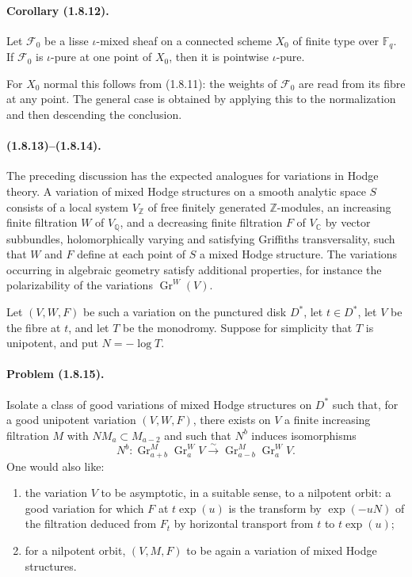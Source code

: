 \documentclass[11pt]{article}
\theoremstyle{remark}
\newcommand{\ZZ}{\mathbb{Z}}
\newcommand{\QQ}{\mathbb{Q}}
\newcommand{\CC}{\mathbb{C}}
\newcommand{\Fq}{\mathbb{F}_q}
\newcommand{\Gr}{\operatorname{Gr}}
\begin{document}
\paragraph{Corollary (1.8.12).}
Let $\mathcal F_0$ be a lisse $\iota$-mixed sheaf on a connected scheme $X_0$ of finite type over $\Fq$. If $\mathcal F_0$ is $\iota$-pure at one point of $X_0$, then it is pointwise $\iota$-pure.

For $X_0$ normal this follows from (1.8.11): the weights of $\mathcal F_0$ are read from its fibre at any point. The general case is obtained by applying this to the normalization and then descending the conclusion.

\paragraph{(1.8.13)--(1.8.14).}
The preceding discussion has the expected analogues for variations in Hodge theory. A variation of mixed Hodge structures on a smooth analytic space $S$ consists of a local system $V_\ZZ$ of free finitely generated $\ZZ$-modules, an increasing finite filtration $W$ of $V_\QQ$, and a decreasing finite filtration $F$ of $V_\CC$ by vector subbundles, holomorphically varying and satisfying Griffiths transversality, such that $W$ and $F$ define at each point of $S$ a mixed Hodge structure. The variations occurring in algebraic geometry satisfy additional properties, for instance the polarizability of the variations $\Gr^W(V)$.

Let $(V,W,F)$ be such a variation on the punctured disk $D^*$, let $t\in D^*$, let $V$ be the fibre at $t$, and let $T$ be the monodromy. Suppose for simplicity that $T$ is unipotent, and put $N=-\log T$.

\paragraph{Problem (1.8.15).}
Isolate a class of good variations of mixed Hodge structures on $D^*$ such that, for a good unipotent variation $(V,W,F)$, there exists on $V$ a finite increasing filtration $M$ with $NM_a\subset M_{a-2}$ and such that $N^b$ induces isomorphisms
\[
N^b:\Gr^M_{a+b}\Gr^W_a V\xrightarrow{\sim}\Gr^M_{a-b}\Gr^W_a V.
\]
One would also like:
\begin{enumerate}[label=\alph*)]
\item the variation $V$ to be asymptotic, in a suitable sense, to a nilpotent orbit: a good variation for which $F$ at $t\exp(u)$ is the transform by $\exp(-uN)$ of the filtration deduced from $F_t$ by horizontal transport from $t$ to $t\exp(u)$;
\item for a nilpotent orbit, $(V,M,F)$ to be again a variation of mixed Hodge structures.
\end{enumerate}
\end{document}
